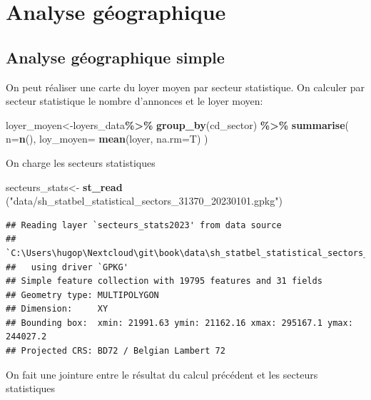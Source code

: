 \documentclass[
]{book}
\newenvironment{Shaded}{\begin{snugshade}}{\end{snugshade}}
\newcommand{\AttributeTok}[1]{\textcolor[rgb]{0.13,0.29,0.53}{#1}}
\newcommand{\FunctionTok}[1]{\textcolor[rgb]{0.13,0.29,0.53}{\textbf{#1}}}
\newcommand{\NormalTok}[1]{#1}
\newcommand{\OtherTok}[1]{\textcolor[rgb]{0.56,0.35,0.01}{#1}}
\newcommand{\SpecialCharTok}[1]{\textcolor[rgb]{0.81,0.36,0.00}{\textbf{#1}}}
\newcommand{\StringTok}[1]{\textcolor[rgb]{0.31,0.60,0.02}{#1}}
\begin{document}
\hypertarget{analyse-guxe9ographique}{%
\section{Analyse géographique}\label{analyse-guxe9ographique}}

\hypertarget{analyse-guxe9ographique-simple}{%
\subsection{Analyse géographique simple}\label{analyse-guxe9ographique-simple}}

On peut réaliser une carte du loyer moyen par secteur statistique. On
calculer par secteur statistique le nombre d'annonces et le loyer moyen:

\begin{Shaded}
\begin{Highlighting}[]
\NormalTok{loyer\_moyen}\OtherTok{\textless{}{-}}\NormalTok{loyers\_data}\SpecialCharTok{\%\textgreater{}\%}
  \FunctionTok{group\_by}\NormalTok{(cd\_sector) }\SpecialCharTok{\%\textgreater{}\%}
  \FunctionTok{summarise}\NormalTok{(}
    \AttributeTok{n=}\FunctionTok{n}\NormalTok{(),}
    \AttributeTok{loy\_moyen=} \FunctionTok{mean}\NormalTok{(loyer, }\AttributeTok{na.rm=}\NormalTok{T)}
\NormalTok{  )}
\end{Highlighting}
\end{Shaded}

On charge les secteurs statistiques

\begin{Shaded}
\begin{Highlighting}[]
\NormalTok{secteurs\_stats}\OtherTok{\textless{}{-}} \FunctionTok{st\_read}\NormalTok{ (}\StringTok{"data/sh\_statbel\_statistical\_sectors\_31370\_20230101.gpkg"}\NormalTok{)}
\end{Highlighting}
\end{Shaded}

\begin{verbatim}
## Reading layer `secteurs_stats2023' from data source 
##   `C:\Users\hugop\Nextcloud\git\book\data\sh_statbel_statistical_sectors_31370_20230101.gpkg' 
##   using driver `GPKG'
## Simple feature collection with 19795 features and 31 fields
## Geometry type: MULTIPOLYGON
## Dimension:     XY
## Bounding box:  xmin: 21991.63 ymin: 21162.16 xmax: 295167.1 ymax: 244027.2
## Projected CRS: BD72 / Belgian Lambert 72
\end{verbatim}

On fait une jointure entre le résultat du calcul précédent et les
secteurs statistiques
\end{document}
